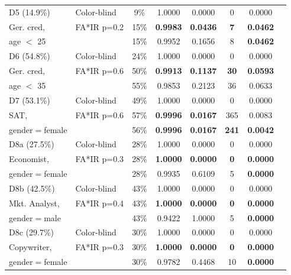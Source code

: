 \begin{table}[t]
{\begin{tabular}{llcccccc}
			D5 (14.9\%) & Color-blind & 9\% & 1.0000 & 0.0000 & 0 & 0.0000 \\
			Ger. cred,& FA*IR p=0.2 & 15\% & \textbf{0.9983} & \textbf{0.0436} & \textbf{7} & \textbf{0.0462} \\
			age $<$ 25 & \citeauthor{Feldman2015} & 15\% & 0.9952 & 0.1656 & 8 & \textbf{0.0462} \\ \midrule
			
			D6 (54.8\%) & Color-blind & 24\% & 1.0000 & 0.0000 & 0 & 0.0000 \\
			Ger. cred, & FA*IR p=0.6 & 50\% & \textbf{0.9913} & \textbf{0.1137} & \textbf{30} & \textbf{0.0593} \\
			age $<$ 35 & \citeauthor{Feldman2015} & 55\% & 0.9853 & 0.2123 & 36 & 0.0633 \\ \midrule
			
			D7 (53.1\%) & Color-blind    & 49\% & 1.0000 & 0.0000 & 0 & 0.0000 \\
			SAT, 	    & FA*IR p=0.6    & 57\% & \textbf{0.9996} & \textbf{0.0167} & 365 & 0.0083 \\ 
			gender$=$female & \citeauthor{Feldman2015} & 56\% & \textbf{0.9996} & \textbf{0.0167} & \textbf{241} & \textbf{0.0042} \\ \midrule
			
			D8a (27.5\%)  & Color-blind    & 28\% & 1.0000 		& 0.0000 	& 0  & 0.0000 \\
			Economist,     & FA*IR p=0.3    & 28\% & \textbf{1.0000} & \textbf{0.0000} & \textbf{0}  & \textbf{0.0000} \\
			gender$=$female & \citeauthor{Feldman2015} & 28\% & 0.9935 		& 0.6109 	& 5 & \textbf{0.0000} \\ \midrule
			D8b (42.5\%)  & Color-blind    & 43\% & 1.0000 		& 0.0000 	& 0           & 0.0000 \\
			Mkt. Analyst,  & FA*IR p=0.4    & 43\% & \textbf{1.0000} & \textbf{0.0000} & \textbf{0}  & \textbf{0.0000} \\
			gender$=$male & \citeauthor{Feldman2015} & 43\% & 0.9422 		& 1.0000 	& 5 & \textbf{0.0000} \\ \midrule
			D8c (29.7\%)  & Color-blind    & 30\% & 1.0000 		& 0.0000 	& 0           & 0.0000 \\
			Copywriter,    & FA*IR p=0.3    & 30\% & \textbf{1.0000} & \textbf{0.0000} & \textbf{0}  & \textbf{0.0000} \\
			gender$=$female & \citeauthor{Feldman2015} & 30\% & 0.9782 & 0.4468 & 10 & \textbf{0.0000} \\
			\bottomrule
		\end{tabular}
	}
	\vspace{-3mm}
\end{table}
